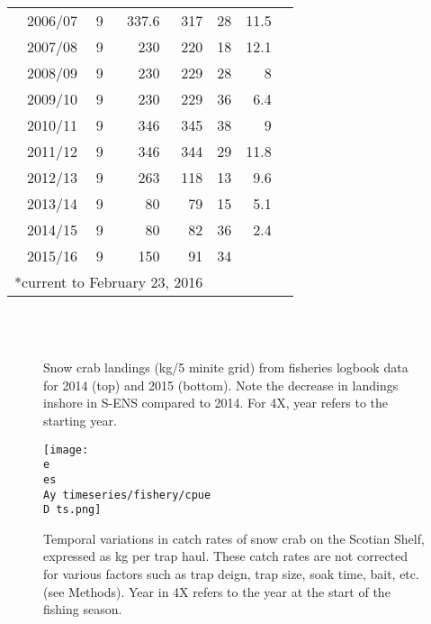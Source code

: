 \documentclass[paper=a4, fontsize=11pt]{article}
\newcommand{\D}{.}
\newcommand{\e}{/home/michelle/ecomod_data/}
\newcommand{\es}{snowcrab/}
\newcommand{\Ay}{assessments/2015/}
\begin{document}
\begin{table}[h]
\begin{center}
\begin{tabular}{rrrrrrr}
2006/07 &   9 & 337.6 & 317 & 28 & 11.5 \\ 
2007/08 &   9 & 230 & 220 & 18 & 12.1 \\ 
2008/09 &   9 & 230 & 229 & 28 & 8 \\ 
2009/10 &   9 & 230 & 229 & 36 & 6.4 \\ 
2010/11 &   9 & 346 & 345 & 38 & 9 \\ 
2011/12 &   9 & 346 & 344 & 29 & 11.8 \\ 
2012/13 &   9 & 263 & 118 & 13 & 9.6 \\ 
2013/14 &   9 & 80 &  79 & 15 & 5.1 \\ 
2014/15 &   9 & 80 &  82 & 36 & 2.4 \\ 
2015/16 &   9& 150 &  91 & 34 &  \\ 
   \hline
   \multicolumn{4}{c}{*current to February 23, 2016}
  \end{tabular}
  \end{center}
\end{table}



\begin{figure}[h]
	\centering
	\\
	\\
	\caption{Snow crab landings (kg/5 minite grid) from fisheries logbook data for 2014 (top) and 2015 (bottom). Note the decrease in landings inshore in S-ENS compared to 2014. For 4X, year refers to the starting year.}
\end{figure}
\begin{figure}[h]
    \centering
    \texttt{[image: \\e \\es \\Ay timeseries/fishery/cpue\\D ts.png]}
    \caption{Temporal variations in catch rates of snow crab on the Scotian Shelf, expressed as kg per trap haul. These catch rates are not corrected for various factors such as trap deign, trap size, soak time, bait, etc. (see Methods). Year in 4X refers to the year at the start of the fishing season.}
\end{figure}
\end{document}
